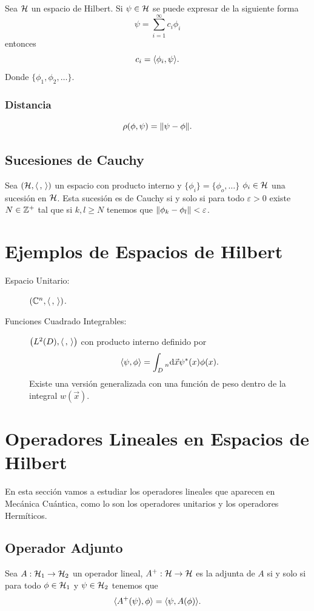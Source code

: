 \begin{teorema}
	Sea $\mathcal{H}$ un espacio de Hilbert. Si $\psi \in \mathcal{H}$ se puede expresar de la siguiente forma
		$$ \psi = \sum _{i=1} ^\infty c_i \phi _i $$
	entonces
		$$ c_i = \langle \phi _i , \psi \rangle. $$
	Donde $\{ \phi _1,\phi _2,\ldots \}$.
\end{teorema}






\subsubsection{Distancia}
$$ \rho(\phi,\psi) = \norm{\psi - \phi}. $$

\subsection{Sucesiones de Cauchy}
Sea $(\mathcal{H} ,\langle \, , \, \rangle)$ un espacio con producto interno y $\{ \phi _i \} = \{ \phi _o,\ldots \}$ $\phi_i \in \mathcal{H}$ una sucesión en $\mathcal{H}$. Esta sucesión es de Cauchy si y solo si para todo $\varepsilon > 0$ existe $N\in \mathbb{Z} ^+$ tal que si $k,l \geq N$ tenemos que $\norm{\phi _k - \phi _l} < \varepsilon$.


\section{Ejemplos de Espacios de Hilbert}

\begin{description}
	\item[Espacio Unitario: ] $\qty(\mathbb{C} ^n, \langle \, , \, \rangle)$.
	\item[Funciones Cuadrado Integrables: ] $\qty(L ^2 (D), \langle \, , \, \rangle)$ con producto interno definido por
		$$ \langle \psi , \phi \rangle = \int _D \prescript{}{n}{\text{d}} \vec{x} \psi ^* (x) \phi (x). $$
		Existe una versión generalizada con una función de peso dentro de la integral $w(\vec{x})$.
\end{description}



\section{Operadores Lineales en Espacios de Hilbert}
En esta sección vamos a estudiar los operadores lineales que aparecen en Mecánica Cuántica, como lo son los operadores unitarios y los operadores Hermíticos. 

\subsection{Operador Adjunto}
Sea $A:\mathcal{H} _1 \to \mathcal{H}_2$ un operador lineal, $A^+ :\mathcal{H} \to \mathcal{H}$ es la adjunta de $A$ si y solo si para todo $\phi \in \mathcal{H}_1$ y $\psi \in \mathcal{H} _2$ tenemos que
	$$ \langle A^+ (\psi) , \phi \rangle = \langle \psi , A(\phi) \rangle. $$
	
